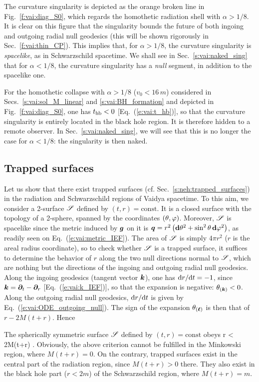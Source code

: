 The curvature singularity is depicted as the orange broken line in Fig.~\ref{f:vai:diag_S0},
which regards the homothetic radiation shell with $\alpha > 1/8$.
It is clear on this figure that the singularity bounds the future of both ingoing and outgoing radial null geodesics (this will be shown rigorously in Sec.~\ref{f:vai:thin_CP}).
This implies that, for $\alpha > 1/8$, the curvature singularity is \emph{spacelike},
as in Schwarzschild spacetime. We shall see in Sec.~\ref{s:vai:naked_sing} that
for $\alpha < 1/8$, the curvature singularity has a \emph{null} segment, in addition to the spacelike
one.

For the homothetic collapse with $\alpha > 1/8$ ($v_0 < 16\, m$) considered in Secs.~\ref{s:vai:sol_M_linear} and
\ref{s:vai:BH_formation} and depicted in Fig.~\ref{f:vai:diag_S0}, one has $t_{\rm hb} < 0$
[Eq.~(\ref{e:vai:t_hb})], so that
the curvature singularity is entirely located in the black hole region. It is therefore hidden
to a remote observer. In Sec.~\ref{s:vai:naked_sing}, we will see that this is no longer the
case for $\alpha < 1/8$: the singularity is then naked.

\subsection{Trapped surfaces} \label{s:vai:trapped_surf}

Let us show that there exist trapped surfaces (cf. Sec.~\ref{s:neh:trapped_surfaces}) in the
radiation and Schwarzschild regions of Vaidya spacetime.
To this aim, we consider a 2-surface $\mathscr{S}$ defined by $(t,r) = \mathrm{const}$. It is a closed surface
with the topology of a 2-sphere, spanned by the coordinates $(\theta,\varphi)$.
Moreover, $\mathscr{S}$ is spacelike since the metric induced by $\bm{g}$ on it  is
$\bm{q} = r^2 \left( \mathbf{d}\theta^2 + \sin^2\theta\, \mathbf{d}\varphi^2 \right) $, as readily seen
on Eq.~(\ref{e:vai:metric_IEF}). The area of $\mathscr{S}$ is simply $4\pi r^2$
($r$ is the areal radius coordinate), so to check whether $\mathscr{S}$ is a trapped surface,
it suffices to determine the behavior
of $r$ along the two null directions normal to $\mathscr{S}$, which are nothing but
the directions of the ingoing and outgoing radial null geodesics.
Along the ingoing geodesics (tangent vector $\bm{k}$),
one has $\mathrm{d} r / \mathrm{d} t = - 1$, since $\bm{k} = \bm{\partial}_t - \bm{\partial}_r$ [Eq.~(\ref{e:vai:k_IEF})],
so that the expansion is negative: $\theta_{(\bm{k})} < 0$.
Along the outgoing radial null geodesics, $\mathrm{d} r / \mathrm{d} t$ is given by Eq.~(\ref{e:vai:ODE_outgoing_null}).
The sign of the expansion $\theta_{(\bm{\ell})}$ is then that of $r - 2M(t+r)$. Hence
\begin{prop}
The spherically symmetric surface $\mathscr{S}$ defined by $(t,r) = \mathrm{const}$ obeys
\be \label{e:vai:S_trapped}
    \Sp {} \iff r < 2M(t+r) .
\ee
Obviously, the above criterion cannot be fulfilled in the Minkowski region, where $M(t+r) = 0$.
On the contrary, trapped surfaces exist
in the central part of the radiation region, since $M(t+r) > 0$ there.
They also exist in the black hole part ($r < 2m$)
of the Schwarzschild region, where
$M(t+r) = m$.
\end{prop}

